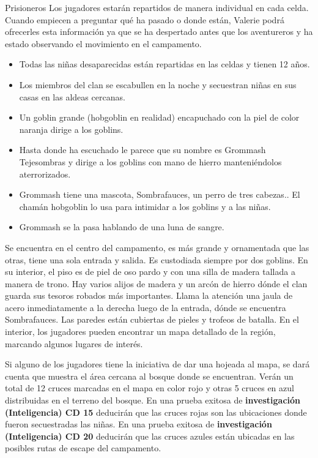 \documentclass[10pt,twoside,twocolumn,openany]{dndbook}
\begin{document}
\begin{DndComment}{Prisioneros}
Los jugadores estarán repartidos de manera individual en cada celda. Cuando empiecen a preguntar 
qué ha pasado o donde están, Valerie podrá ofrecerles esta información ya que se ha despertado 
antes que los aventureros y ha estado observando el movimiento en el campamento.

  \begin{itemize}
    \item Todas las niñas desaparecidas están repartidas en las celdas y tienen 12 años.
    \item Los miembros del clan se escabullen en la noche y secuestran niñas en sus casas en las 
    aldeas cercanas.
    \item Un goblin grande (hobgoblin en realidad) encapuchado con la piel de color naranja 
    dirige a los goblins. 
    \item Hasta donde ha escuchado le parece que su nombre es Grommash Tejesombras y 
    dirige a los goblins con mano de hierro manteniéndolos aterrorizados.
    \item Grommash tiene una mascota, Sombrafauces, un perro de tres cabezas.. El chamán 
    hobgoblin lo usa para intimidar a los goblins y a las niñas.
    \item Grommash se la pasa hablando de una luna de sangre.
  \end{itemize}

\end{DndComment}

Se encuentra en el centro del campamento, es más grande y ornamentada que las otras, tiene una sola 
entrada y salida. Es custodiada siempre por dos goblins. En su interior, el piso es de piel de oso pardo 
y con una silla de madera tallada a manera de trono. Hay varios alijos de madera y un arcón de hierro 
dónde el clan guarda sus tesoros robados más importantes. Llama la atención una jaula de acero 
inmediatamente a la derecha luego de la entrada, dónde se encuentra Sombrafauces. Las paredes están 
cubiertas de pieles y trofeos de batalla. En el interior, los jugadores pueden encontrar un mapa 
detallado de la región, marcando algunos lugares de interés.

Si alguno de los jugadores tiene la iniciativa de dar una hojeada al mapa, se dará cuenta que 
muestra el área cercana al bosque donde se encuentran. Verán un total de 12 cruces marcadas en el 
mapa en color rojo y otras 5 cruces en azul distribuidas en el terreno del bosque. En una prueba 
exitosa de \textbf{investigación (Inteligencia) CD 15} deducirán que las cruces rojas son las 
ubicaciones donde fueron secuestradas las niñas. En una prueba exitosa de 
\textbf{investigación (Inteligencia) CD 20} deducirán que las cruces azules están ubicadas en 
las posibles rutas de escape del campamento. 
\end{document}
